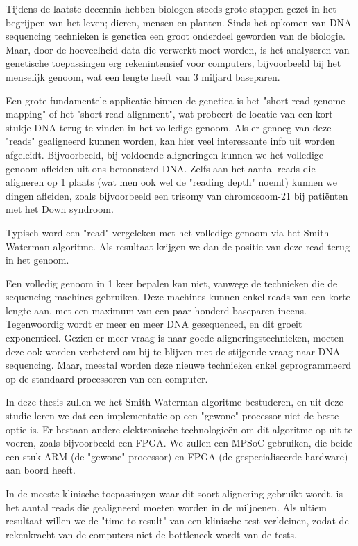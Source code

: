 Tijdens de laatste decennia hebben biologen steeds grote stappen gezet in het begrijpen van het leven; dieren, mensen en planten. Sinds het opkomen van DNA sequencing technieken is genetica een groot onderdeel geworden van de biologie. Maar, door de hoeveelheid data die verwerkt moet worden, is het analyseren van genetische toepassingen erg rekenintensief voor computers, bijvoorbeeld bij het menselijk genoom, wat een lengte heeft van 3 miljard baseparen.

Een grote fundamentele applicatie binnen de genetica is het "short read genome mapping" of het "short read alignment", wat probeert de locatie van een kort stukje DNA terug te vinden in het volledige genoom. Als er genoeg van deze "reads" gealigneerd kunnen worden, kan hier veel interessante info uit worden afgeleidt. Bijvoorbeeld, bij voldoende aligneringen kunnen we het volledige genoom afleiden uit ons bemonsterd DNA. Zelfs aan het aantal reads die aligneren op 1 plaats (wat men ook wel de "reading depth" noemt) kunnen we dingen afleiden, zoals bijvoorbeeld een trisomy van chromosoom-21 bij patiënten met het Down syndroom.

Typisch word een "read" vergeleken met het volledige genoom via het Smith-Waterman algoritme. Als resultaat krijgen we dan de positie van deze read terug in het genoom.

Een volledig genoom in 1 keer bepalen kan niet, vanwege de technieken die de sequencing machines gebruiken. Deze machines kunnen enkel reads van een korte lengte aan, met een maximum van een paar honderd baseparen ineens. Tegenwoordig wordt er meer en meer DNA gesequenced, en dit groeit exponentieel. Gezien er meer vraag is naar goede aligneringstechnieken, moeten deze ook worden verbeterd om bij te blijven met de stijgende vraag naar DNA sequencing. Maar, meestal worden deze nieuwe technieken enkel geprogrammeerd op de standaard processoren van een computer.

In deze thesis zullen we het Smith-Waterman algoritme bestuderen, en uit deze studie leren we dat een implementatie op een "gewone" processor niet de beste optie is. Er bestaan andere elektronische technologieën om dit algoritme op uit te voeren, zoals bijvoorbeeld een FPGA. We zullen een MPSoC gebruiken, die beide een stuk ARM (de "gewone" processor) en FPGA (de gespecialiseerde hardware) aan boord heeft.

In de meeste klinische toepassingen waar dit soort alignering gebruikt wordt, is het aantal reads die gealigneerd moeten worden in de miljoenen. Als ultiem resultaat willen we de "time-to-result" van een klinische test verkleinen, zodat de rekenkracht van de computers niet de bottleneck wordt van de tests.

